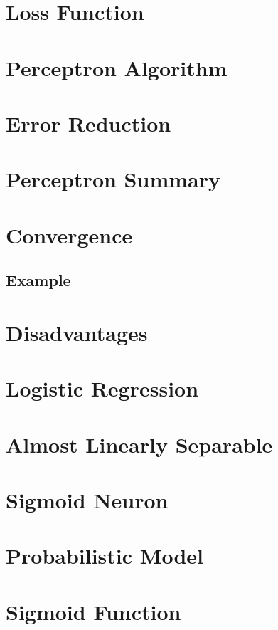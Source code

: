 \documentclass[12pt, a4paper]{article}
\begin{document}
\section*{Loss Function}

\section*{Perceptron Algorithm}

\section*{Error Reduction}

\section*{Perceptron Summary}

\section*{Convergence}
\subsection*{Example}

\section*{Disadvantages}

\section*{Logistic Regression}

\section*{Almost Linearly Separable}

\section*{Sigmoid Neuron}

\section*{Probabilistic Model}

\section*{Sigmoid Function}
\end{document}
